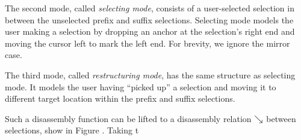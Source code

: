 The second mode, called \emph{selecting mode},
consists of a user-selected selection in between
the unselected prefix and suffix selections.
Selecting mode models the user making a selection by dropping
an anchor at the selection's right end and moving
the cursor left to mark the left end.
For brevity, we ignore the mirror case.

The third mode, called \emph{restructuring mode},
has the same structure as selecting mode.
It models the user having ``picked up'' a selection
and moving it to different target location within the
prefix and suffix selections.




Such a disassembly function can be lifted to a disassembly
relation $\searrow$ between selections, show in Figure .
Taking t









